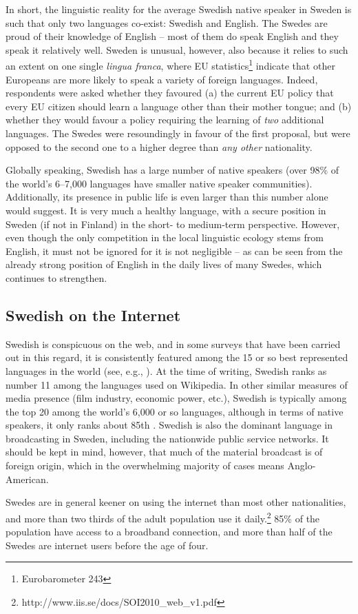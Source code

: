 \begin{multicols}{2}
In short, the linguistic reality for the average Swedish native
speaker in Sweden is such that only two languages co-exist: Swedish
and English. The Swedes are proud of their knowledge of English -- most
of them do speak English and they speak it relatively well. Sweden is
unusual, however, also because it relies to such an extent on one
single \textit{lingua franca}, where EU
statistics\footnote{Eurobarometer 243} indicate that other Europeans
are more likely to speak a variety of foreign languages. Indeed,
respondents were asked whether they favoured (a) the current EU policy
that every EU citizen should learn a language other than their mother
tongue; and (b) whether they would favour a policy requiring the
learning of \textit{two} additional languages. The Swedes were
resoundingly in favour of the first proposal, but were opposed to the
second one to a higher degree than \textit{any other} nationality.

Globally speaking, Swedish has a large number of native speakers (over
98\% of the world’s 6--7,000 languages have smaller native speaker
communities). Additionally, its presence in public life is even larger
than this number alone would suggest. It is very much a healthy
language, with a secure position in Sweden (if not in Finland) in the
short- to medium-term perspective. However, even though the only
competition in the local linguistic ecology stems from English, it
must not be ignored for it is not negligible -- as can be seen from
the already strong position of English in the daily lives of many
Swedes, which continues to strengthen.

\subsection{Swedish on the Internet}

Swedish is conspicuous on the web, and in some surveys that have been
carried out in this regard, it is consistently featured among the 15
or so best represented languages in the world (see, e.g.,
\cite[63]{parkvall2006}). At the time of writing, Swedish ranks as
number 11 among the languages used on Wikipedia. In other similar
measures of media presence (film industry, economic power, etc.),
Swedish is typically among the top 20 among the world’s 6,000 or so
languages, although in terms of native speakers, it only ranks about
85th \cite[55--64]{parkvall2006}. Swedish is also the dominant
language in broadcasting in Sweden, including the nationwide public
service networks. It should be kept in mind, however, that much of the
material broadcast is of foreign origin, which in the overwhelming
majority of cases means Anglo-American.


Swedes are in general keener on using the internet than most other
nationalities, and more than two thirds of the adult population use it
daily.\footnote{http://www.iis.se/docs/SOI2010\_web\_v1.pdf } 85\% of
the population have access to a broadband connection, and more than
half of the Swedes are internet users before the age of four.
\end{multicols}

